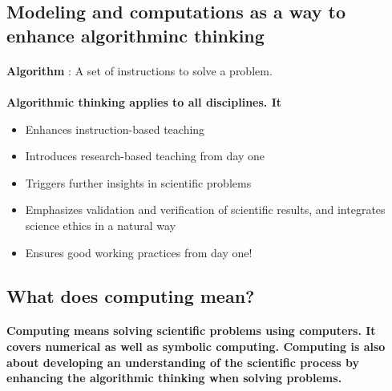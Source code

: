 \documentclass[%
twoside,                 %
final,                   %
10pt]{article}
\begin{document}
\noindent



\subsection*{Modeling and computations as a way to enhance algorithminc thinking}


\paragraph{}
\textbf{Algorithm} :
A set of instructions to solve a problem.




\paragraph{}
\textbf{Algorithmic thinking applies to all disciplines. It}
\begin{itemize}
\item Enhances instruction-based teaching

\item Introduces research-based teaching  from day one

\item Triggers further insights in scientific problems

\item Emphasizes validation and verification of scientific results, and integrates science ethics in a natural way

\item Ensures good working practices from day one!
\end{itemize}

\noindent





\subsection*{What does computing mean?}


\paragraph{}

\textbf{Computing means solving scientific problems using computers. It covers numerical as well as symbolic computing. Computing is also about developing an understanding of the scientific process by enhancing the algorithmic thinking when solving problems.}
\end{document}
